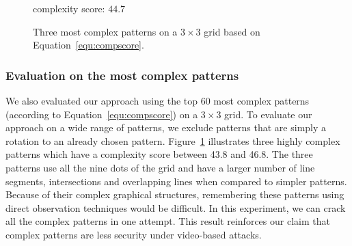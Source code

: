 \begin{figure}[!t]
{\begin{minipage}[b]{0.1\textwidth}
                \centering  complexity score: $44.7$
                \end{minipage}
            }
            \hspace{0.5cm}
            \caption{Three most complex patterns on a $3\times 3$ grid based on Equation~\ref{equ:compscore}.}
            \label{fig:most complex patterns}
            \vspace{-4mm}
        \end{figure}

     \subsubsection{Evaluation on the most complex patterns}
       We also evaluated our approach using the top 60 most complex
        patterns (according to Equation~\ref {equ:compscore}) on a $3 \times 3$
        grid.
        To evaluate our approach on a wide range of patterns, we exclude patterns that are simply a rotation to an already chosen pattern.
         Figure~\ref{fig:most complex patterns} illustrates three
        highly complex patterns which have a complexity score between 43.8 and 46.8. The three
        patterns use all the nine dots of the grid and have a larger number of line segments, intersections and overlapping lines when compared to simpler patterns.
        Because of their complex graphical structures, remembering
        these patterns using direct observation techniques would be difficult.
        In this experiment, we can crack all the complex patterns in one attempt. This result reinforces our claim that complex
        patterns are less security under video-based attacks.

